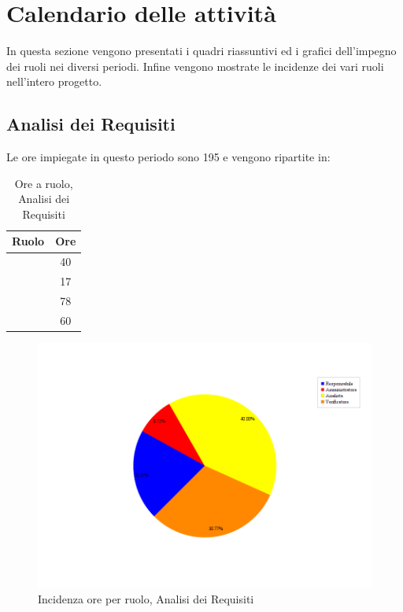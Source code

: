 \section{Calendario delle attività}
In questa sezione vengono presentati i quadri riassuntivi ed i grafici dell'impegno dei ruoli nei diversi periodi. Infine vengono mostrate le incidenze dei vari ruoli nell'intero progetto.

\subsection{Analisi dei Requisiti}
Le ore impiegate in questo periodo sono 195 e vengono ripartite in:
\begin{table}[H]
	\begin{center}
		\begin{tabular}{|c|c|}
			\hline
			\textbf{Ruolo}	& \textbf{Ore} \\
			\hline
			\Res	&	40	\\
			\hline
			\Amm	&	17	\\
			\hline
			\Ana	&	78	\\
			\hline
			\Ver	&	60	\\
			\hline
		\end{tabular}
	\end{center}
	\caption{Ore a ruolo, Analisi dei Requisiti}
\end{table}

\begin{figure}[H]
	\centering
	\includegraphics[scale=0.5]{immagini/Grafi/OreRuoloRR}
	\caption{Incidenza ore per ruolo, Analisi dei Requisiti}
\end{figure}

